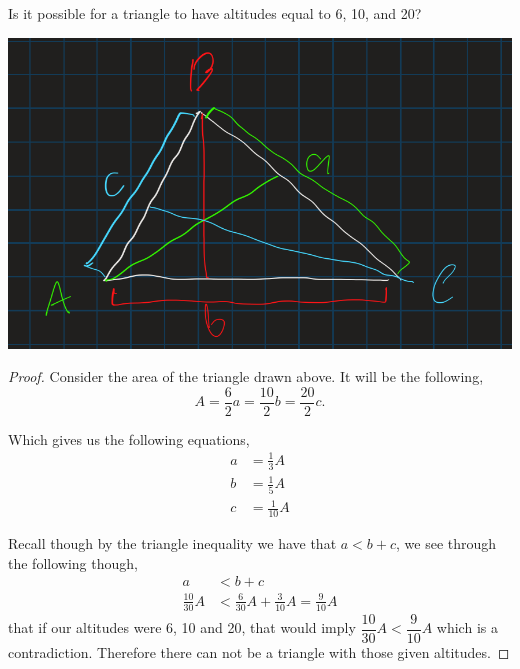 \documentclass[11pt]{article}
\newenvironment{problem}[2][Problem\!]{\begin{trivlist}
\item[\hskip \labelsep {\bfseries #1}\hskip \labelsep {\bfseries #2}]}{\end{trivlist}}
\begin{document}
\begin{tcolorbox}
    \begin{problem} {IC | 11/15 | 151.}
        Is it possible for a triangle to have altitudes equal to 6, 10, and 20?
    \end{problem}
\end{tcolorbox}
\includegraphics[scale=.5]{prob2}
\begin{proof}
    Consider the area of the triangle drawn above. It will be the following,
    \[A = \frac{6}{2}a = \frac{10}{2}b = \frac{20}{2}c.\]

    Which gives us the following equations,
    \begin{align*}
        a &= \frac{1}{3}A \\
        b &= \frac{1}{5}A \\
        c &= \frac{1}{10}A
    \end{align*}

    Recall though by the triangle inequality we have that $a < b + c$, we see through the following though,
    \begin{align*}
        a &< b + c \\
        \frac{10}{30}A &< \frac{6}{30}A + \frac{3}{10}A = \frac{9}{10}A
    \end{align*}
    that if our altitudes were 6, 10 and 20, that would imply $\dfrac{10}{30}A < \dfrac{9}{10}A$ which is a contradiction. Therefore there can not be a triangle with those given altitudes. 
\end{proof}
\end{document}
